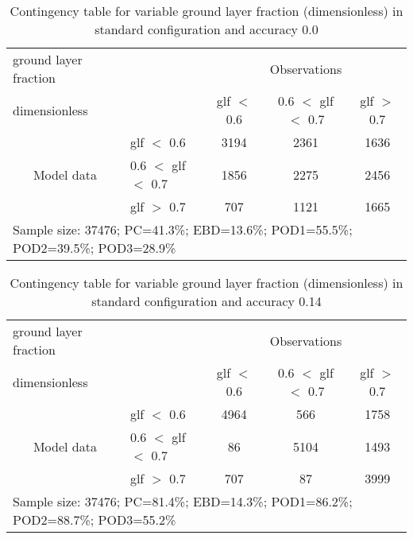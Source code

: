 \documentclass[11pt,english]{article}
\begin{document}
\newpage

\clearpage
\begin{table}[]
\begin{center}
\begin{tabular}{llccc}
\hline
{ground layer fraction}                                       &                                                    & \multicolumn{3}{c}{Observations}                 \\
{dimensionless}                                       &                             & glf $<$ 0.6   & 0.6 $<$ glf $<$ 0.7 & glf $>$ 0.7 \\
\hline
\multicolumn{1}{c}{\multirow{3}{*}{Model data}}  & glf $<$ 0.6             & 3194                & 2361                       & 1636              \\
                                                 & 0.6  $<$ glf $<$ 0.7 & 1856                & 2275                       & 2456              \\
                                                 & glf $>$ 0.7             & 707                & 1121                       & 1665              \\
\hline
\multicolumn{5}{l}{Sample size: 37476; PC=41.3\%; EBD=13.6\%; POD1=55.5\%; POD2=39.5\%; POD3=28.9\%}
\end{tabular}
\end{center}
\caption{Contingency table for variable ground layer fraction (dimensionless) in standard configuration and accuracy 0.0}
\label{tab:contingencyglfBEF}
\end{table}
\begin{table}[]
\begin{center}
\begin{tabular}{llccc}
\hline
{ground layer fraction}                                       &                                                    & \multicolumn{3}{c}{Observations}                 \\
{dimensionless}                                       &                             & glf $<$ 0.6   & 0.6 $<$ glf $<$ 0.7 & glf $>$ 0.7 \\
\hline
\multicolumn{1}{c}{\multirow{3}{*}{Model data}}  & glf $<$ 0.6             & 4964                & 566                       & 1758              \\
                                                 & 0.6  $<$ glf $<$ 0.7 & 86                & 5104                       & 1493              \\
                                                 & glf $>$ 0.7             & 707                & 87                       & 3999              \\
\hline
\multicolumn{5}{l}{Sample size: 37476; PC=81.4\%; EBD=14.3\%; POD1=86.2\%; POD2=88.7\%; POD3=55.2\%}
\end{tabular}
\end{center}
\caption{Contingency table for variable ground layer fraction (dimensionless) in standard configuration and accuracy 0.14}
\label{tab:contingencyglfBEF}
\end{table}
\end{document}
